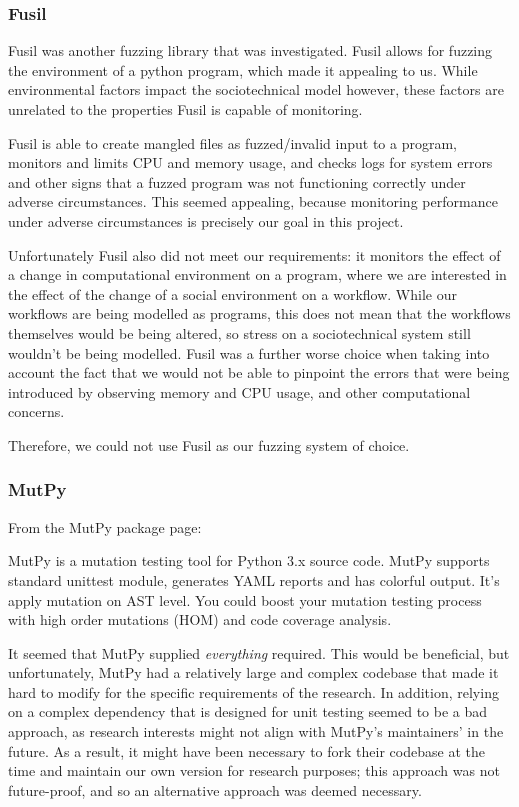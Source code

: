 \documentclass{sig-alternate}
\begin{document}
\subsubsection{Fusil}
\label{fuzzing_fuzil}
Fusil was another fuzzing library that was investigated. Fusil allows for fuzzing the environment of a python program, which made it appealing to us. While environmental factors impact the sociotechnical model however, these factors are unrelated to the properties Fusil is capable of monitoring. \par
Fusil is able to create mangled files as fuzzed/invalid input to a program, monitors and limits CPU and memory usage, and checks logs for system errors and other signs that a fuzzed program was not functioning correctly under adverse circumstances. This seemed appealing, because monitoring performance under adverse circumstances is precisely our goal in this project. \par
Unfortunately Fusil also did not meet our requirements: it monitors the effect of a change in computational environment on a program, where we are interested in the effect of the change of a social environment on a workflow. While our workflows are being modelled as programs, this does not mean that the workflows themselves would be being altered, so stress on a sociotechnical system still wouldn't be being modelled. Fusil was a further worse choice when taking into account the fact that we would not be able to pinpoint the errors that were being introduced by observing memory and CPU usage, and other computational concerns. \par
Therefore, we could not use Fusil as our fuzzing system of choice. \par

\subsubsection{MutPy} 
\label{fuzzing_mutpy}
From the MutPy package page\cite{mutpy26}: 
\begin{displayquote}
MutPy is a mutation testing tool for Python 3.x source code. MutPy supports standard unittest module, generates YAML reports and has colorful output. It’s apply mutation on AST level. You could boost your mutation testing process with high order mutations (HOM) and code coverage analysis.
\end{displayquote}\par

It seemed that MutPy supplied \emph{everything} required. This would be beneficial, but unfortunately, MutPy had a relatively large and complex codebase\cite{khala8:online} that made it hard to modify for the specific requirements of the research. In addition, relying on a complex dependency that is designed for unit testing seemed to be a bad approach, as research interests might not align with MutPy's maintainers' in the future. As a result, it might have been necessary to fork their codebase at the time and maintain our own version for research purposes; this approach was not future-proof, and so an alternative approach was deemed necessary. \par
\end{document}
